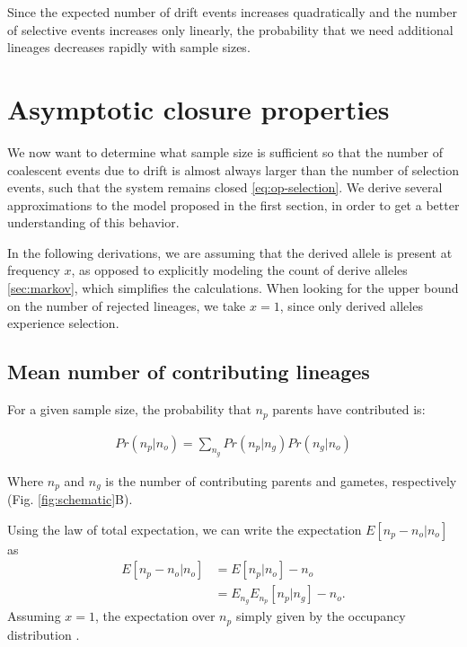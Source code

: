 \documentclass[review]{elsarticle}
\begin{document}
Since the expected number of drift events increases quadratically and the number of selective events
increases only linearly, the probability that we need additional lineages decreases rapidly with
sample sizes.

\section{Asymptotic closure properties}

We now want to determine what sample size is sufficient so that the number of coalescent events due
to drift is almost always larger than the number of selection events, such that the system remains
closed \eqref{eq:op-selection}. We derive several approximations to the model proposed in the first
section, in order to get a better understanding of this behavior.

In the following derivations, we are assuming that the derived allele is present at frequency $x$,
as opposed to explicitly modeling the count of derive alleles \ref{sec:markov}, which simplifies the
calculations. When looking for the upper bound on the number of rejected lineages, we take $x=1$,
since only derived alleles experience selection.

\subsection{Mean number of contributing lineages}
\label{sec:mean-contr}


For a given sample size, the probability that $n_p$ parents have contributed is:

\begin{align}
  \label{eq:conditional}
  Pr(n_p | n_o) = \sum_{n_g} Pr(n_p | n_g)Pr(n_g | n_o)
\end{align}

Where $n_p$ and $n_g$ is the number of contributing parents and gametes, respectively (Fig.
\ref{fig:schematic}B). %

Using the law of total expectation, we can write the expectation $E[n_p-n_o | n_o]$ as 
\begin{equation*}
  \begin{aligned}
    \label{eq:lineages-approx}
    E[n_p -n_o | n_o] &= E[n_p | n_o] - n_o \\
    &=E_{n_g} E_{n_p}[n_p | n_g] -n_o.
  \end{aligned}
\end{equation*}
Assuming $x=1$, the expectation over $n_p$ simply given by the occupancy distribution \cite{}. 
\end{document}

